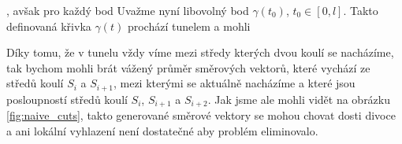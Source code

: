 , avšak pro každý bod
Uvažme nyní libovolný bod $ \gamma(t_0)$, $ t_0 \in [0, l] $. Takto definovaná křivka $ \gamma(t) $ prochází tunelem a mohli



Díky tomu, že v tunelu vždy víme mezi středy kterých dvou
koulí se nacházíme, tak bychom mohli brát vážený průměr směrových vektorů,
které vychází ze středů koulí $ S_i $ a $ S_{i + 1} $, mezi kterými se aktuálně
nacházíme a které jsou posloupností středů koulí $ S_i $, $ S_{i + 1} $ a
$ S_{i + 2} $. Jak jsme ale mohli vidět na obrázku \ref{fig:naive_cuts}, takto
generované směrové vektory se mohou chovat dosti divoce a ani lokální vyhlazení
není dostatečné aby problém eliminovalo.
